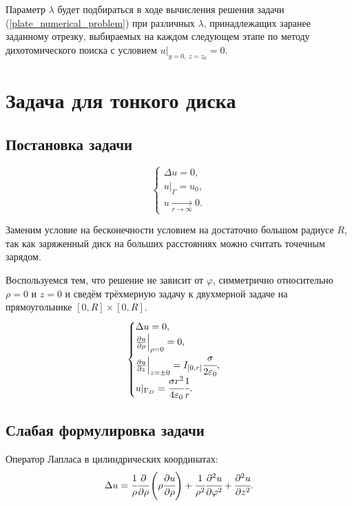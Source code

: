 \documentclass{report}
\begin{document}
Параметр $\lambda$ будет подбираться в ходе вычисления решения задачи (\ref{plate_numerical_problem}) при различных $\lambda$, принадлежащих заранее заданному отрезку, выбираемых на каждом следующем этапе по методу дихотомического поиска с условием $u|_{y=0,~ z=z_0}=0$.

\chapter{Задача для тонкого диска}
\section{Постановка задачи}
\begin{equation}
	\begin{cases}
		\Delta u = 0,\\
		u|_{\Gamma}=u_0,\\
		u\xrightarrow[r\rightarrow\infty]{}0.
	\end{cases}
\end{equation}

Заменим условие на бесконечности условием на достаточно большом радиусе $R$, так как заряженный диск на больших расстояниях можно считать точечным зарядом.

Воспользуемся тем, что решение не зависит от $\varphi$, симметрично относительно $\rho=0$ и $z=0$ и сведём трёхмерную задачу к двухмерной задаче на прямоугольнике $[0, R]\times[0,R]$.
\begin{equation}\label{disk_problem}
	\begin{cases}
		\Delta u = 0,\\
		\pdv{u}{\rho}\Bigr|_{\rho=0}=0,\\
		\pdv{u}{z}\Bigr|_{z=\pm 0}=I_{[0,r]}\cfrac{\sigma}{2\varepsilon_0},\\
		u|_{\Gamma_D}=\cfrac{\sigma r^2}{4 \varepsilon_0}\cfrac{1}{r}.
	\end{cases}
\end{equation}

\section{Слабая формулировка задачи}
Оператор Лапласа в цилиндрических координатах:
\begin{equation}
	\Delta u = \cfrac{1}{\rho}\cfrac{\partial}{\partial \rho}\left(\rho\cfrac{\partial u}{\partial \rho}\right) + \cfrac{1}{\rho^2}\cfrac{\partial^2u}{\partial \varphi^2}+\cfrac{\partial^2u}{\partial z^2}.
\end{equation}
\end{document}
